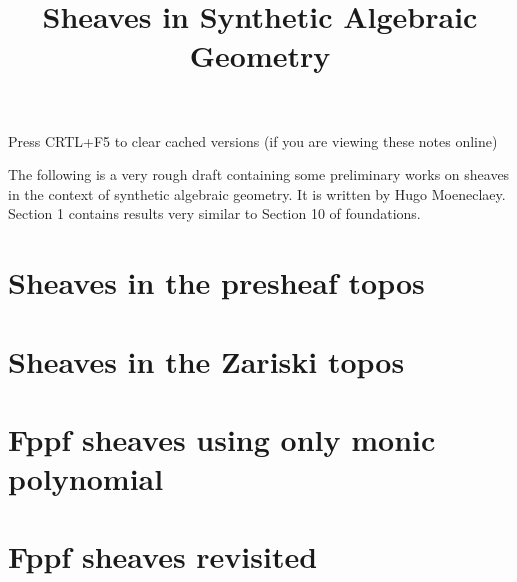 \documentclass{../util/zariski}
\title{Sheaves in Synthetic Algebraic Geometry}
\begin{document}
\maketitle

\begin{center}
  \color{purple}
  \large{Press CRTL+F5 to clear cached versions}
  \large{(if you are viewing these notes online)}
\end{center}

The following is a very rough draft containing some preliminary works on sheaves in the context of synthetic algebraic geometry. It is written by Hugo Moeneclaey. Section 1 contains results very similar to Section 10 of foundations.

\tableofcontents

\section{Sheaves in the presheaf topos}


\section{Sheaves in the Zariski topos}


\section{Fppf sheaves using only monic polynomial}


\section{Fppf sheaves revisited}




\printindex

\printbibliography
\end{document}
